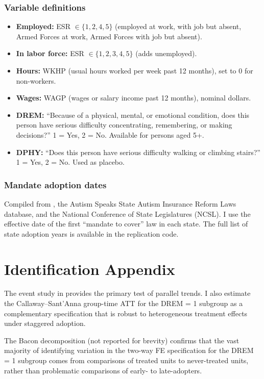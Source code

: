\documentclass[12pt]{article}
\begin{document}
\subsubsection*{Variable definitions}
\begin{itemize}
\item \textbf{Employed:} ESR $\in \{1, 2, 4, 5\}$ (employed at work, with job but absent, Armed Forces at work, Armed Forces with job but absent).
\item \textbf{In labor force:} ESR $\in \{1, 2, 3, 4, 5\}$ (adds unemployed).
\item \textbf{Hours:} WKHP (usual hours worked per week past 12 months), set to 0 for non-workers.
\item \textbf{Wages:} WAGP (wages or salary income past 12 months), nominal dollars.
\item \textbf{DREM:} ``Because of a physical, mental, or emotional condition, does this person have serious difficulty concentrating, remembering, or making decisions?'' 1 = Yes, 2 = No. Available for persons aged 5+.
\item \textbf{DPHY:} ``Does this person have serious difficulty walking or climbing stairs?'' 1 = Yes, 2 = No. Used as placebo.
\end{itemize}

\subsubsection*{Mandate adoption dates}  Compiled from \citet{chatterji2015}, the Autism Speaks State Autism Insurance Reform Laws database, and the National Conference of State Legislatures (NCSL). I use the effective date of the first ``mandate to cover'' law in each state. The full list of state adoption years is available in the replication code.

\section{Identification Appendix}

The event study in  provides the primary test of parallel trends. I also estimate the Callaway--Sant'Anna group-time ATT for the DREM = 1 subgroup as a complementary specification that is robust to heterogeneous treatment effects under staggered adoption.

The Bacon decomposition (not reported for brevity) confirms that the vast majority of identifying variation in the two-way FE specification for the DREM = 1 subgroup comes from comparisons of treated units to never-treated units, rather than problematic comparisons of early- to late-adopters.
\end{document}
